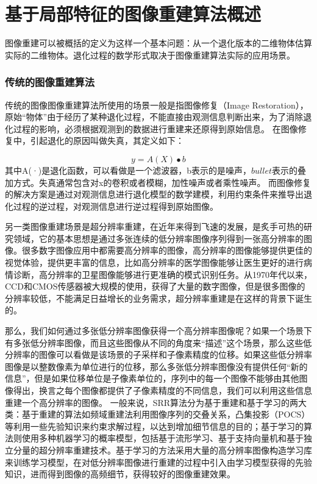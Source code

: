 

\chapter{基于局部特征的图像重建算法概述}

图像重建可以被概括的定义为这样一个基本问题：从一个退化版本的二维物体估算实际的二维物体\cite{Li:2008vn}。退化过程的数学形式取决于图像重建算法实际的应用场景。


\subsection{传统的图像重建算法}
传统的图像图像重建算法所使用的场景一般是指图像修复（Image Restoration），原始“物体”由于经历了某种退化过程，不能直接由观测信息判断出来，为了消除退化过程的影响，必须根据观测到的数据进行重建来还原得到原始信息。
在图像修复中，引起退化的原因叫做失真，其定义如下：

\begin{equation}
y = A(X) \bullet b
\end{equation}
其中A(·)是退化函数，可以看做是一个滤波器，b表示的是噪声，\(bullet\)表示的叠加方式。失真通常包含对x的卷积或者模糊，加性噪声或者乘性噪声。
而图像修复的解决方案是通过对观测信息进行退化模型的数学建模，利用约束条件来推导出退化过程的逆过程，对观测信息进行逆过程得到原始图像。

另一类图像重建场景是超分辨率重建，在近年来得到飞速的发展，是炙手可热的研究领域，它的基本思想是通过多张连续的低分辨率图像序列得到一张高分辨率的图像。很多数字图像应用中都需要高分辨率的图像，高分辨率的图像能够提供更佳的视觉体验，提供更丰富的信息，比如高分辨率的医学图像能够让医生更好的进行病情诊断，高分辨率的卫星图像能够进行更准确的模式识别任务。从1970年代以来，CCD和CMOS传感器被大规模的使用，获得了大量的数字图像，但是很多图像的分辨率较低，不能满足日益增长的业务需求，超分辨率重建是在这样的背景下诞生的。

那么，我们如何通过多张低分辨率图像获得一个高分辨率图像呢？如果一个场景下有多张低分辨率图像，而且这些图像从不同的角度来“描述”这个场景，那么这些低分辨率的图像可以看做是该场景的子采样和子像素精度的位移。如果这些低分辨率图像是以整数像素为单位进行的位移，那么多张低分辨率图像没有提供任何“新的信息”，但是如果位移单位是子像素单位的，序列中的每一个图像不能够由其他图像得出，换言之每个图像都提供了子像素精度的不同信息，我们可以利用这些信息重建一个高分辨率的图像。
一般来说，SRR算法分为基于重建和基于学习的两大类：基于重建的算法如频域重建法利用图像序列的交叠关系，凸集投影（POCS）等利用一些先验知识来约束求解过程，以达到增加细节信息的目的；基于学习的算法则使用多种机器学习的概率模型，包括基于流形学习、基于支持向量机和基于独立分量的超分辨率重建技术。基于学习的方法采用大量的高分辨率图像构造学习库来训练学习模型，在对低分辨率图像进行重建的过程中引入由学习模型获得的先验知识，进而得到图像的高频细节，获得较好的图像重建效果。

